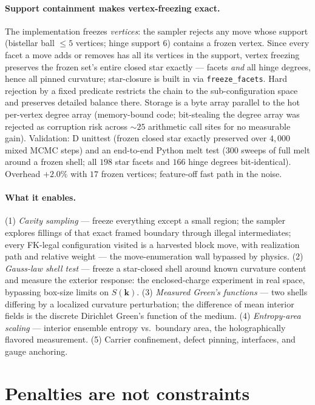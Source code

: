 \documentclass[11pt]{article}
\begin{document}
\paragraph{Support containment makes vertex-freezing exact.} The
implementation freezes \emph{vertices}: the sampler rejects any move whose
support (bistellar ball $\leq 5$ vertices; hinge support $6$) contains a
frozen vertex. Since every facet a move adds or removes has all its vertices
in the support, vertex freezing preserves the frozen set's entire closed
star exactly --- facets \emph{and} all hinge degrees, hence all pinned
curvature; star-closure is built in via \texttt{freeze\_facets}. Hard
rejection by a fixed predicate restricts the chain to the sub-configuration
space and preserves detailed balance there. Storage is a byte array parallel
to the hot per-vertex degree array (memory-bound code; bit-stealing the
degree array was rejected as corruption risk across $\sim 25$ arithmetic
call sites for no measurable gain). Validation: D unittest (frozen closed
star exactly preserved over $4{,}000$ mixed MCMC steps) and an end-to-end
Python melt test ($300$ sweeps of full melt around a frozen shell; all $198$
star facets and $166$ hinge degrees bit-identical). Overhead $+2.0\%$ with
$17$ frozen vertices; feature-off fast path in the noise.

\paragraph{What it enables.} (1) \emph{Cavity sampling} --- freeze everything
except a small region; the sampler explores fillings of that exact framed
boundary through illegal intermediates; every FK-legal configuration visited
is a harvested block move, with realization path and relative weight ---
the move-enumeration wall bypassed by physics. (2) \emph{Gauss-law shell
test} --- freeze a star-closed shell around known curvature content and
measure the exterior response: the enclosed-charge experiment in real space,
bypassing box-size limits on $S(\mathbf k)$. (3) \emph{Measured Green's
functions} --- two shells differing by a localized curvature perturbation;
the difference of mean interior fields is the discrete Dirichlet Green's
function of the medium. (4) \emph{Entropy-area scaling} --- interior
ensemble entropy vs.\ boundary area, the holographically flavored
measurement. (5) Carrier confinement, defect pinning, interfaces, and gauge
anchoring.

\section{Penalties are not constraints}
\label{sec:penalties}
\end{document}
